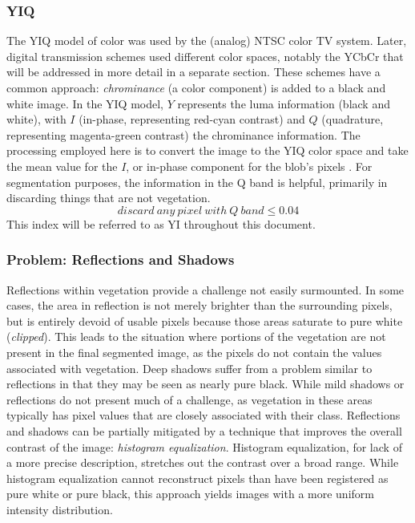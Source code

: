 \documentclass[agriculture,article,submit,pdftex,moreauthors]{Definitions/mdpi}
\begin{document}
\subsubsection{YIQ}
The YIQ model of color was used by the (analog) NTSC color TV system. Later, digital transmission schemes used different color spaces, notably the YCbCr that will be addressed in more detail in a separate section. These schemes have a common approach: \textit{chrominance} (a color component) is added to a black and white image. In the YIQ model, $Y$ represents the luma information (black and white), with $I$ (in-phase, representing red-cyan contrast) and $Q$ (quadrature, representing magenta-green contrast) the chrominance information. 
The processing employed here is to convert the image to the YIQ color space and take the mean value for the $I$, or in-phase component for the blob's pixels \cite{MathWorks2023-xp}. For segmentation purposes, the information in the Q band is helpful, primarily in discarding things that are not vegetation.
\begin{equation}
	\label{equation:yiq}
	discard\ any\ pixel\ with\ Q\ band\leq 0.04
\end{equation}
This index will be referred to as YI throughout this document.









\subsubsection{Problem: Reflections and Shadows}
Reflections within vegetation provide a challenge not easily surmounted.  In some cases, the area in reflection is not merely brighter than the surrounding pixels, but is entirely devoid of usable pixels because those areas saturate to pure white (\textit{clipped}). This leads to the situation where portions of the vegetation are not present in the final segmented image, as the pixels do not contain the values associated with vegetation.  Deep shadows suffer from a problem similar to reflections in that they may be seen as nearly pure black. While mild shadows or reflections do not present much of a challenge, as vegetation in these areas typically has pixel values that are closely associated with their class. Reflections and shadows can be partially mitigated by a technique that improves the overall contrast of the image: \textit{histogram equalization}. Histogram equalization, for lack of a more precise description, stretches out the contrast over a broad range. While histogram equalization cannot reconstruct pixels than have been registered as pure white or pure black, this approach yields images with a more uniform intensity distribution.
\end{document}
